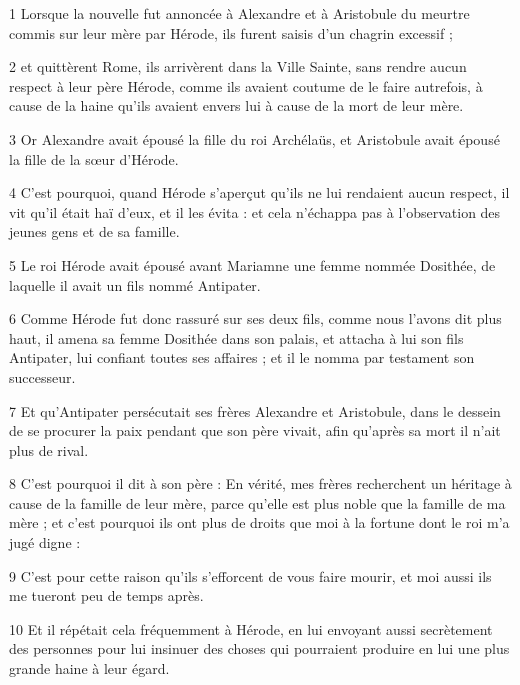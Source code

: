 \par 1 Lorsque la nouvelle fut annoncée à Alexandre et à Aristobule du meurtre commis sur leur mère par Hérode, ils furent saisis d'un chagrin excessif ;

\par 2 et quittèrent Rome, ils arrivèrent dans la Ville Sainte, sans rendre aucun respect à leur père Hérode, comme ils avaient coutume de le faire autrefois, à cause de la haine qu'ils avaient envers lui à cause de la mort de leur mère.

\par 3 Or Alexandre avait épousé la fille du roi Archélaüs, et Aristobule avait épousé la fille de la sœur d'Hérode.

\par 4 C'est pourquoi, quand Hérode s'aperçut qu'ils ne lui rendaient aucun respect, il vit qu'il était haï d'eux, et il les évita : et cela n'échappa pas à l'observation des jeunes gens et de sa famille.

\par 5 Le roi Hérode avait épousé avant Mariamne une femme nommée Dosithée, de laquelle il avait un fils nommé Antipater.

\par 6 Comme Hérode fut donc rassuré sur ses deux fils, comme nous l'avons dit plus haut, il amena sa femme Dosithée dans son palais, et attacha à lui son fils Antipater, lui confiant toutes ses affaires ; et il le nomma par testament son successeur.

\par 7 Et qu'Antipater persécutait ses frères Alexandre et Aristobule, dans le dessein de se procurer la paix pendant que son père vivait, afin qu'après sa mort il n'ait plus de rival.

\par 8 C'est pourquoi il dit à son père : En vérité, mes frères recherchent un héritage à cause de la famille de leur mère, parce qu'elle est plus noble que la famille de ma mère ; et c'est pourquoi ils ont plus de droits que moi à la fortune dont le roi m'a jugé digne :

\par 9 C'est pour cette raison qu'ils s'efforcent de vous faire mourir, et moi aussi ils me tueront peu de temps après.

\par 10 Et il répétait cela fréquemment à Hérode, en lui envoyant aussi secrètement des personnes pour lui insinuer des choses qui pourraient produire en lui une plus grande haine à leur égard.

